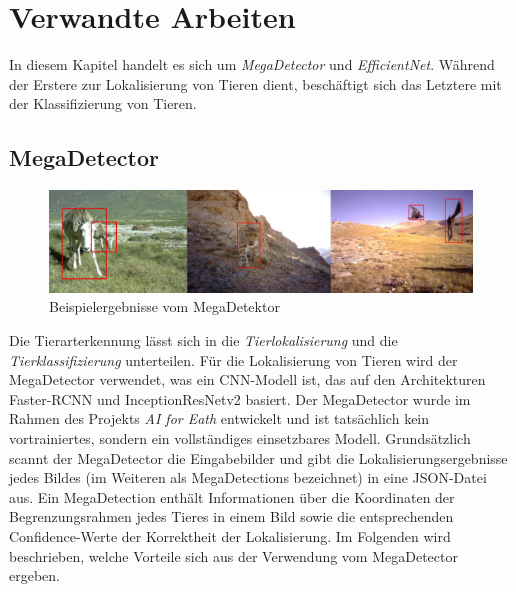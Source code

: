 \chapter{Verwandte Arbeiten} \label{chap:relatedwork}

In diesem Kapitel handelt es sich um \emph{MegaDetector} und \emph{EfficientNet}. Während der Erstere zur Lokalisierung von Tieren dient, beschäftigt sich das Letztere mit der Klassifizierung von Tieren. 

\section{MegaDetector} \label{sec:megadetector}

\begin{figure}[!hb]
	\centering
	\includegraphics[width=\linewidth]{images/Megadetector example}
	\caption{Beispielergebnisse vom MegaDetektor \protect\cite{beery2019efficient}}
	\label{fig:Megadetectorexample}
\end{figure}

Die Tierarterkennung lässt sich in die \emph{Tierlokalisierung} und die \emph{Tierklassifizierung} unterteilen. Für die Lokalisierung von Tieren wird der MegaDetector \cite{beery2019efficient} verwendet, was ein CNN-Modell ist, das auf den Architekturen Faster-RCNN \cite{ren2016faster} und InceptionResNetv2 \cite{szegedy2016inceptionv4} basiert. Der MegaDetector wurde im Rahmen des Projekts \emph{AI for Eath} entwickelt und ist tatsächlich kein vortrainiertes, sondern ein vollständiges einsetzbares Modell. Grundsätzlich scannt der MegaDetector die Eingabebilder und gibt die Lokalisierungsergebnisse jedes Bildes (im Weiteren als MegaDetections bezeichnet) in eine JSON-Datei aus. Ein MegaDetection enthält Informationen über die Koordinaten der Begrenzungsrahmen jedes Tieres in einem Bild sowie die entsprechenden Confidence-Werte der Korrektheit der Lokalisierung. Im Folgenden wird beschrieben, welche Vorteile sich aus der Verwendung vom MegaDetector ergeben.

